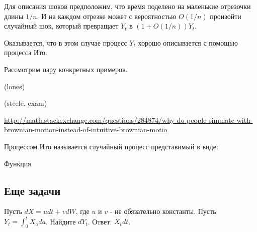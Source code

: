 {Для описания шоков предположим, что время поделено на маленькие отрезочки длины $1/n$. И на каждом отрезке может с вероятностью $O(1/n)$ произойти случайный шок, который превращает $Y_{t}$ в $(1+O(1/n))Y_{t}$.

Оказывается, что в этом случае процесс $Y_{t}$ хорошо описывается с помощью процесса Ито.

Рассмотрим пару конкретных примеров.

(lones)


(steele, exam)

\url{http://math.stackexchange.com/questions/284874/why-do-people-simulate-with-brownian-motion-instead-of-intuitive-brownian-motio}



\begin{mydef}
Процессом Ито называется случайный процесс представимый в виде:

\end{mydef}

Функция










}\subsection{Еще задачи}


Пусть $dX=udt+vdW$, где $u$ и $v$ - не обязательно константы. Пусть $Y_{t}=\int_{0}^{t}X_{a}da$. Найдите $dY_{t}$.
Ответ: $X_{t}dt$.


